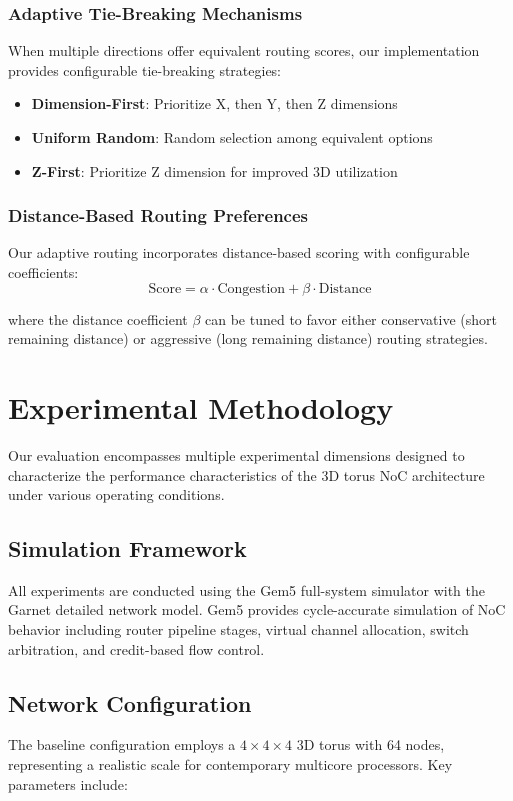 \documentclass[a4paper,12pt]{article}
\begin{document}
\subsubsection{Adaptive Tie-Breaking Mechanisms}
When multiple directions offer equivalent routing scores, our implementation provides configurable tie-breaking strategies:

\begin{itemize}
    \item \textbf{Dimension-First}: Prioritize X, then Y, then Z dimensions
    \item \textbf{Uniform Random}: Random selection among equivalent options
    \item \textbf{Z-First}: Prioritize Z dimension for improved 3D utilization
\end{itemize}

\subsubsection{Distance-Based Routing Preferences}
Our adaptive routing incorporates distance-based scoring with configurable coefficients:
\begin{equation}
\text{Score} = \alpha \cdot \text{Congestion} + \beta \cdot \text{Distance}
\end{equation}

where the distance coefficient $\beta$ can be tuned to favor either conservative (short remaining distance) or aggressive (long remaining distance) routing strategies.

\section{Experimental Methodology}

Our evaluation encompasses multiple experimental dimensions designed to characterize the performance characteristics of the 3D torus NoC architecture under various operating conditions.

\subsection{Simulation Framework}
All experiments are conducted using the Gem5 full-system simulator with the Garnet detailed network model. Gem5 provides cycle-accurate simulation of NoC behavior including router pipeline stages, virtual channel allocation, switch arbitration, and credit-based flow control.

\subsection{Network Configuration}
The baseline configuration employs a $4 \times 4 \times 4$ 3D torus with 64 nodes, representing a realistic scale for contemporary multicore processors. Key parameters include:
\end{document}

